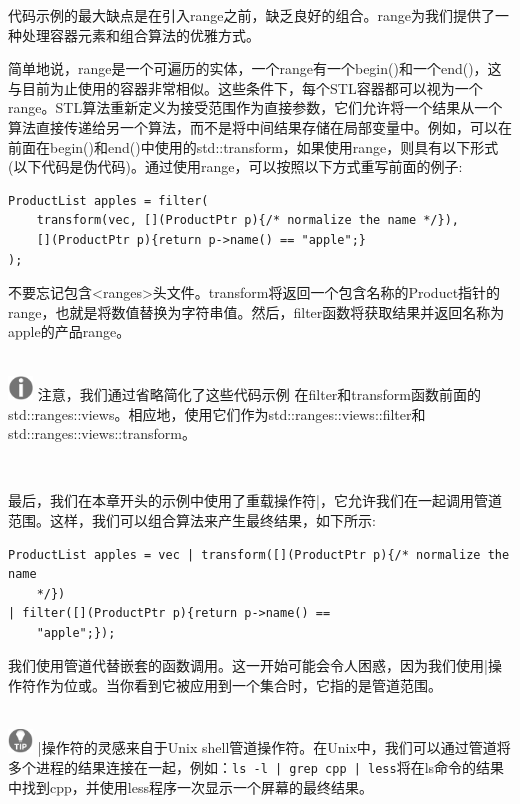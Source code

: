 代码示例的最大缺点是在引入range之前，缺乏良好的组合。range为我们提供了一种处理容器元素和组合算法的优雅方式。 \par
简单地说，range是一个可遍历的实体，一个range有一个begin()和一个end()，这与目前为止使用的容器非常相似。这些条件下，每个STL容器都可以视为一个range。STL算法重新定义为接受范围作为直接参数，它们允许将一个结果从一个算法直接传递给另一个算法，而不是将中间结果存储在局部变量中。例如，可以在前面在begin()和end()中使用的std::transform，如果使用range，则具有以下形式(以下代码是伪代码)。通过使用range，可以按照以下方式重写前面的例子: \par

\begin{lstlisting}[caption={}]
ProductList apples = filter(
	transform(vec, [](ProductPtr p){/* normalize the name */}),
	[](ProductPtr p){return p->name() == "apple";}
);
\end{lstlisting}

不要忘记包含<ranges>头文件。transform将返回一个包含名称的Product指针的range，也就是将数值替换为字符串值。然后，filter函数将获取结果并返回名称为apple的产品range。 \par

\hspace*{\fill} \\ %
\includegraphics[width=0.05\textwidth]{images/warn}
注意，我们通过省略简化了这些代码示例
在filter和transform函数前面的std::ranges::views。相应地，使用它们作为std::ranges::views::filter和std::ranges::views::transform。 \par
\noindent\textbf{}\ \par

最后，我们在本章开头的示例中使用了重载操作符|，它允许我们在一起调用管道范围。这样，我们可以组合算法来产生最终结果，如下所示: \par

\begin{lstlisting}[caption={}]
ProductList apples = vec | transform([](ProductPtr p){/* normalize the name
	*/})
| filter([](ProductPtr p){return p->name() ==
	"apple";});
\end{lstlisting}

我们使用管道代替嵌套的函数调用。这一开始可能会令人困惑，因为我们使用|操作符作为位或。当你看到它被应用到一个集合时，它指的是管道范围。 \par

\hspace*{\fill} \\ %
\includegraphics[width=0.05\textwidth]{images/tip}
|操作符的灵感来自于Unix shell管道操作符。在Unix中，我们可以通过管道将多个进程的结果连接在一起，例如：\texttt{ls -l | grep cpp | less}将在ls命令的结果中找到cpp，并使用less程序一次显示一个屏幕的最终结果。 \par
\noindent\textbf{}\ \par

